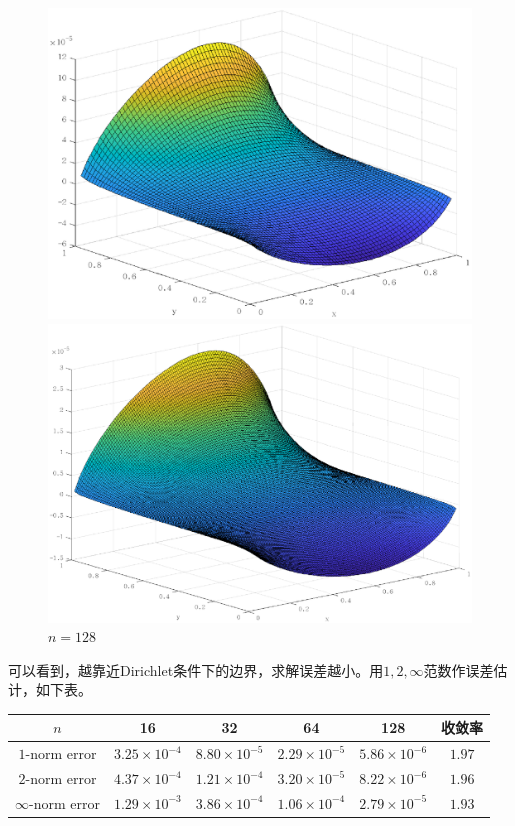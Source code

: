 \documentclass[lang=cn,11pt,a4paper]{elegantpaper}
\begin{document}
\begin{figure}[htbp]
\begin{minipage}[t]{0.24\linewidth}
    \includegraphics[width=0.95\linewidth]{figure/error_problem1_m_r_n=64.eps}
    \caption*{$n=64$}
  \end{minipage}
  \begin{minipage}[t]{0.24\linewidth}
    \centering
    \includegraphics[width=0.95\linewidth]{figure/error_problem1_m_r_n=128.eps}
    \caption*{$n=128$}
  \end{minipage}
\end{figure}

可以看到，越靠近Dirichlet条件下的边界，求解误差越小。用$1,2,\infty$范数作误差估计，如下表。

\begin{table}[H]
  \centering
  \begin{tabular}{c|cccc|c}
  \textbf{$n$}        & 16                   & 32                   & 64                   & 128                  & 收敛率 \\ \hline
  $1$-norm error      & $3.25\times 10^{-4}$ & $8.80\times 10^{-5}$ & $2.29\times 10^{-5}$ & $5.86\times 10^{-6}$ & $1.97$\\
  $2$-norm error      & $4.37\times 10^{-4}$ & $1.21\times 10^{-4}$ & $3.20\times 10^{-5}$ & $8.22\times 10^{-6}$ & $1.96$\\
  $\infty$-norm error & $1.29\times 10^{-3}$ & $3.86\times 10^{-4}$ & $1.06\times 10^{-4}$ & $2.79\times 10^{-5}$ & $1.93$
  \end{tabular}
\end{table}
\end{document}
